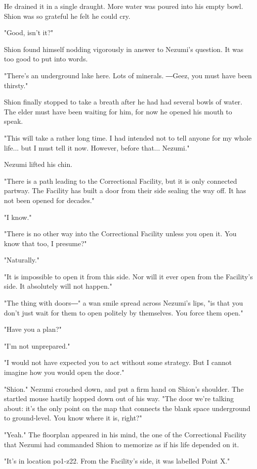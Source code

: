 He drained it in a single draught. More water was poured into his empty
bowl. Shion was so grateful he felt he could cry.

"Good, isn't it?"

Shion found himself nodding vigorously in answer to Nezumi's question.
It was too good to put into words.

"There's an underground lake here. Lots of minerals. ―Geez, you must
have been thirsty."

Shion finally stopped to take a breath after he had had several bowls of
water. The elder must have been waiting for him, for now he opened his
mouth to speak.

"This will take a rather long time. I had intended not to tell anyone
for my whole life... but I must tell it now. However, before that...
Nezumi."

Nezumi lifted his chin.

"There is a path leading to the Correctional Facility, but it is only
connected partway. The Facility has built a door from their side sealing
the way off. It has not been opened for decades."

"I know."

"There is no other way into the Correctional Facility unless you open
it. You know that too, I presume?"

"Naturally."

"It is impossible to open it from this side. Nor will it ever open from
the Facility's side. It absolutely will not happen."

"The thing with doors―" a wan smile spread across Nezumi's lips, "is
that you don't just wait for them to open politely by themselves. You
force them open."

"Have you a plan?"

"I'm not unprepared."

"I would not have expected you to act without some strategy. But I
cannot imagine how you would open the door."

"Shion." Nezumi crouched down, and put a firm hand on Shion's shoulder.
The startled mouse hastily hopped down out of his way. "The door we're
talking about: it's the only point on the map that connects the blank
space underground to ground-level. You know where it is, right?"

"Yeah." The floorplan appeared in his mind, the one of the Correctional
Facility that Nezumi had commanded Shion to memorize as if his life
depended on it.

"It's in location po1-z22. From the Facility's side, it was labelled
Point X."

